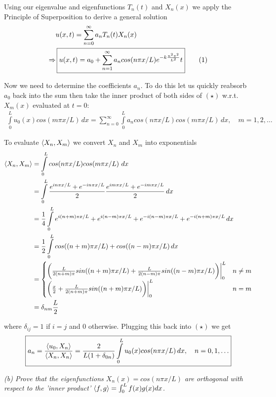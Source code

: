 \documentclass[10pt]{article}
\newcommand\numberthis{\addtocounter{equation}{1}\tag{\theequation}}
\theoremstyle{remark}
\begin{document}
Using our eigenvalue and eigenfunctions $T_n(t)$ and $X_n(x)$ we apply the Principle of Superposition to derive a general solution
\begin{align*}
	& u(x,t) = \sum\limits_{n=0}^\infty a_nT_n(t)X_n(x) \\
	\Rightarrow & \, \boxed{u(x,t) = a_0 + \sum\limits_{n=1}^\infty a_ncos(n\pi x/L)e^{-k\frac{n^2\pi^2}{L^2}}t} \numberthis
\end{align*}

Now we need to determine the coefficients $a_n$. To do this let us quickly reabsorb $a_0$ back into the sum then take the inner product of both sides of $(\star)$ w.r.t. $X_m(x)$ evaluated at $t = 0$:
\begin{align*}
\int\limits_0^L u_0(x)cos(m\pi x/L) \, dx = \sum\limits_{n=0}^\infty\int\limits_0^L a_ncos(n\pi x/L)cos(m\pi x/L) \, dx, \quad m = 1,2,\ldots \tag{$\star$}
\end{align*}

To evaluate $\braket{X_n,X_m}$ we convert $X_n$ and $X_m$ into exponentials
\begin{align*}
	\braket{X_n, X_m} & = \int\limits_0^L cos(n\pi x/L)cos(m\pi x/L) \ dx \\
	& = \int\limits_0^L \frac{e^{in\pi x/L} + e^{-in\pi x/L}}{2}\frac{e^{im\pi x/L} + e^{-im\pi x/L}}{2} \, dx \\
	& = \frac{1}{4} \int\limits_0^L e^{i(n+m)\pi x/L} + e^{i(n-m)\pi x/L} + e^{-i(n-m)\pi x/L} + e^{-i(n+m)\pi x/L} \, dx \\
	& = \frac{1}{2}\int\limits_0^L cos((n+m)\pi x/L) + cos((n-m)\pi x/L) \, dx \\
	& = {
	\begin{cases}
	\bigg(\frac{L}{2(n+m)\pi}sin((n+m)\pi x/L) + \frac{L}{2(n-m)\pi}sin((n-m)\pi x/L)\bigg)\bigg\vert_0^L & n \neq m \\
	\bigg(\frac{x}{2} + \frac{L}{2(n+m)\pi}sin((n+m)\pi x/L)\bigg)\bigg\vert_0^L & n = m
	\end{cases}} \\
	& = \delta_{nm}\frac{L}{2}
\end{align*}

where $\delta_{ij}= 1$ if $i = j$ and 0 otherwise. Plugging this back into $(\star)$ we get 
\begin{align}
	\boxed{a_n = \frac{\braket{u_0, X_n}}{\braket{X_n, X_n}} = \frac{2}{L(1 + \delta_{0n})}\int\limits_0^L u_0(x)cos(n\pi x/ L) \, dx, \quad n = 0,1,\ldots}
\end{align}

\textit{(b) Prove that the eigenfunctions $X_n(x) = cos(n\pi x/L)$ are orthogonal with respect to the 'inner product' $\Braket{f,g} = \int_0^L f(x)g(x)dx$.} \
\end{document}
